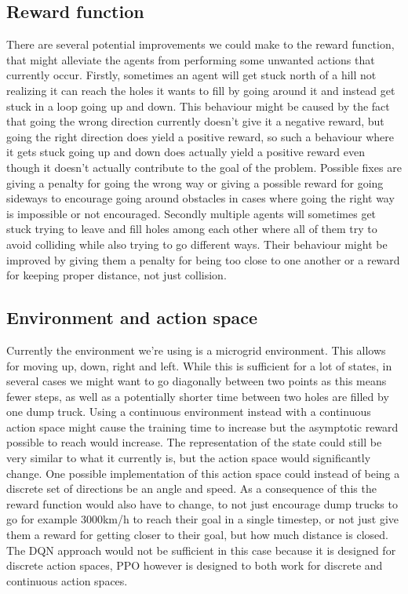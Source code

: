 \documentclass[conference]{IEEEtran}
\begin{document}
	\subsection{Reward function}
	There are several potential improvements we could make to the reward function, that might alleviate the agents from performing some unwanted actions that currently occur.
	Firstly, sometimes an agent will get stuck north of a hill not realizing it can reach the holes it wants to fill by going around it and instead get stuck in a loop going up and down.
	This behaviour might be caused by the fact that going the wrong direction currently doesn't give it a negative reward, but going the right direction does yield a positive reward, so such a behaviour where it gets stuck going up and down does actually yield a positive reward even though it doesn't actually contribute to the goal of the problem.
	Possible fixes are giving a penalty for going the wrong way or giving a possible reward for going sideways to encourage going around obstacles in cases where going the right way is impossible or not encouraged.
	Secondly multiple agents will sometimes get stuck trying to leave and fill holes among each other where all of them try to avoid colliding while also trying to go different ways.
	Their behaviour might be improved by giving them a penalty for being too close to one another or a reward for keeping proper distance, not just collision.

	\subsection{Environment and action space}
	Currently the environment we're using is a microgrid environment. This allows for moving up, down, right and left.
	While this is sufficient for a lot of states, in several cases we might want to go diagonally between two points as this means fewer steps, as well as a potentially shorter time between two holes are filled by one dump truck.
	Using a continuous environment instead with a continuous action space might cause the training time to increase but the asymptotic reward possible to reach would increase. The representation of the state could still be very similar to what it currently is, but the action space would significantly change.
	One possible implementation of this action space could instead of being a discrete set of directions be an angle and speed.
	As a consequence of this the reward function would also have to change, to not just encourage dump trucks to go for example 3000km/h to reach their goal in a single timestep, or not just give them a reward for getting closer to their goal, but how much distance is closed.
	The DQN approach would not be sufficient in this case because it is designed for discrete action spaces, PPO however is designed to both work for discrete and continuous action spaces.
\end{document}
